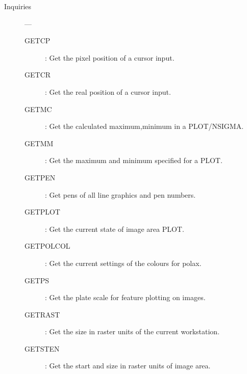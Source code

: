 \begin{description}
\item [Inquiries] ---
\begin{description}
\item [GETCP] : Get the pixel position of a cursor input.
\item [GETCR] : Get the real position of a cursor input.
\item [GETMC] : Get the calculated maximum,minimum in a PLOT/NSIGMA.
\item [GETMM] : Get the maximum and minimum specified for a PLOT.
\item [GETPEN] : Get pens of all line graphics and pen numbers.
\item [GETPLOT] : Get the current state of image area PLOT.
\item [GETPOLCOL] : Get the current settings of the colours for polax.
\item [GETPS] : Get the plate scale for feature plotting on images.
\item [GETRAST] : Get the size in raster units of the current workstation.
\item [GETSTEN] : Get the start and size in raster units of image area.
\end{description}


\end{description}
